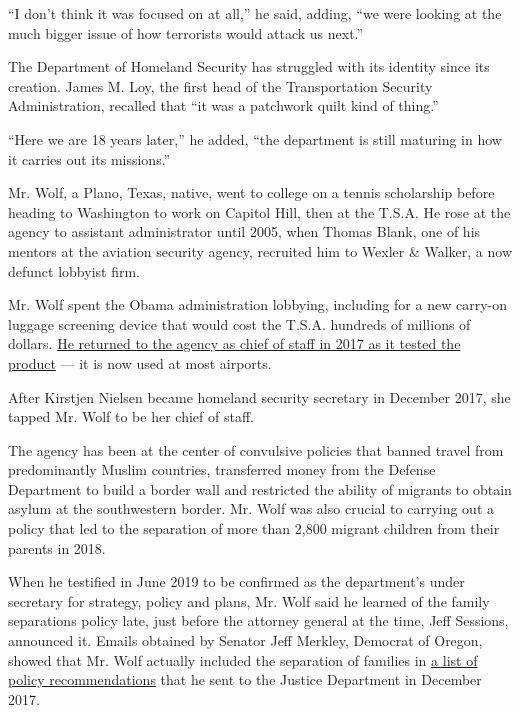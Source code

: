 ``I don't think it was focused on at all,'' he said, adding, ``we were
looking at the much bigger issue of how terrorists would attack us
next.''

The Department of Homeland Security has struggled with its identity
since its creation. James M. Loy, the first head of the Transportation
Security Administration, recalled that ``it was a patchwork quilt kind
of thing.''

``Here we are 18 years later,'' he added, ``the department is still
maturing in how it carries out its missions.''

Mr. Wolf, a Plano, Texas, native, went to college on a tennis
scholarship before heading to Washington to work on Capitol Hill, then
at the T.S.A. He rose at the agency to assistant administrator until
2005, when Thomas Blank, one of his mentors at the aviation security
agency, recruited him to Wexler \& Walker, a now defunct lobbyist firm.

Mr. Wolf spent the Obama administration lobbying, including for a new
carry-on luggage screening device that would cost the T.S.A. hundreds of
millions of dollars.
\href{https://www.nytimes3xbfgragh.onion/2017/04/15/us/politics/trump-appointees-potential-conflicts.html}{He
returned to the agency as chief of staff in 2017 as it tested the
product} --- it is now used at most airports.

After Kirstjen Nielsen became homeland security secretary in December
2017, she tapped Mr. Wolf to be her chief of staff.

The agency has been at the center of convulsive policies that banned
travel from predominantly Muslim countries, transferred money from the
Defense Department to build a border wall and restricted the ability of
migrants to obtain asylum at the southwestern border. Mr. Wolf was also
crucial to carrying out a policy that led to the separation of more than
2,800 migrant children from their parents in 2018.

When he testified in June 2019 to be confirmed as the department's under
secretary for strategy, policy and plans, Mr. Wolf said he learned of
the family separations policy late, just before the attorney general at
the time, Jeff Sessions, announced it. Emails obtained by Senator Jeff
Merkley, Democrat of Oregon, showed that Mr. Wolf actually included the
separation of families in
\href{https://www.nbcnews.com/politics/immigration/watchdog-group-trump-dhs-pick-made-false-claims-about-role-n1078171}{a
list of policy recommendations} that he sent to the Justice Department
in December 2017.

